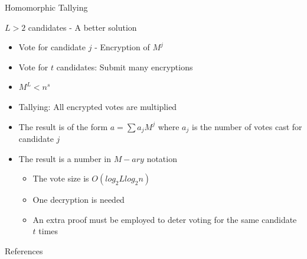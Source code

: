 \documentclass{beamer}
\begin{document}
\begin{frame}[allowframebreaks]{Homomorphic Tallying \cite{Damgard03ageneralization}}
\begin{block}{$L>2$ candidates - A better solution \cite{Damgard03ageneralization}}
\begin{itemize}
\item Vote for candidate $j$ - Encryption of $M^j$
\item Vote for $t$ candidates: Submit many encryptions
\item $M^L < n^s$
\item Tallying: All encrypted votes are multiplied
\item The result is of the form $a = \sum a_j M^j$ where $a_j$ is the number of votes cast for candidate $j$ 
\item The result is a number in $M-ary$ notation
\begin{itemize}
\item The vote size is   $O(log_2L  log_{2}n)$
\item One decryption is needed
\item An extra proof must be employed to deter voting for the same candidate $t$ times
\end{itemize}
\end{itemize}
\end{block}


\end{frame}

\begin{frame}[allowframebreaks]{References}
\begin{small}
\nocite{*}


\end{small}
\end{frame}

 
\end{document}
